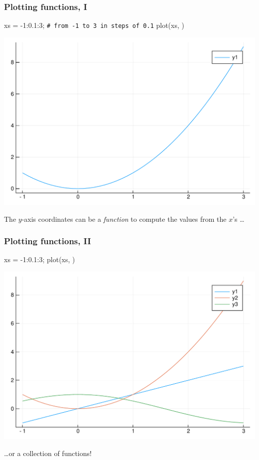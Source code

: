 \documentclass[english,serif,mathserif,xcolor=pdftex,dvipsnames,table]{beamer}
\begin{document}
\begin{frame}
  \frametitle{Plotting functions, I}
\begin{semiverbatim}\small
\julia xs = -1:0.1:3; \lstinline|# from -1 to 3 in steps of 0.1|
\julia plot(xs, )
\end{semiverbatim}
  \begin{center}
    \includegraphics[height=0.60\textheight]{fig/plot3.pdf}
  \end{center}
  The $y$-axis coordinates can be a \emph{function} to compute the
  values from the $x$'s \ldots
\end{frame}


\begin{frame}
  \frametitle{Plotting functions, II}
\begin{semiverbatim}\small
\julia xs = -1:0.1:3;
\julia plot(xs, \HL{[x->x, x->x^2, x->cos(x)]})
\end{semiverbatim}
  \begin{center}
    \includegraphics[height=0.60\textheight]{fig/plot4.pdf}
  \end{center}
  \ldots or a collection of functions!
\end{frame}
\end{document}
